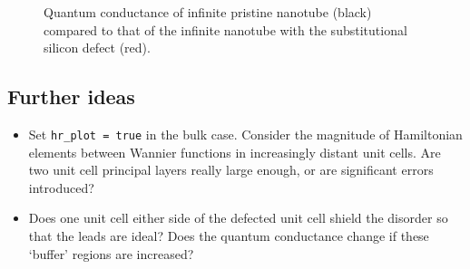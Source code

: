 \documentclass[a4paper,11pt,twoside]{article}
\begin{document}
\begin{figure}[h]
\begin{center}
\caption{Quantum conductance of infinite pristine nanotube (black) 
compared to that of the infinite nanotube with the substitutional silicon 
defect (red).}
\label{fig:cnt_qc}
\end{center}
\end{figure}

\subsection*{Further ideas}
\begin{itemize}
\item Set {\tt hr\_plot = true} in the bulk case. Consider the magnitude of Hamiltonian 
	elements between Wannier functions in increasingly distant unit cells. Are two 
	unit cell principal layers really large enough, or are significant errors introduced?
\item Does one unit cell either side of the defected unit cell shield the disorder
	so that the leads are ideal? Does the quantum conductance change if these 
	`buffer' regions are increased?
\end{itemize}

\end{document}
